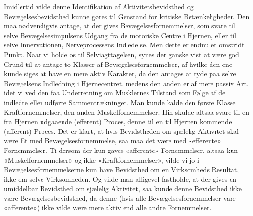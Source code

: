 \documentclass[12pt,a4paper,openany]{book}
\begin{document}
Imidlertid vilde denne Identifikation af Aktivitetsbevidsthed og
Bevægelsesbevidsthed kunne gøres til Genstand for kritiske Betænkeligheder. Den
maa nødvendigvis antage, at der gives Bevægelsesfornemmelser, som svare til
selve Bevægelsesimpulsens Udgang fra de motoriske Centre i Hjernen, eller til
selve Innervationen, Nerveprocessens Indledelse. Men dette er endnu et omstridt
Punkt. Naar vi holde os til Selviagttagelsen, synes der ganske vist at være god
Grund til at antage to Klasser af Bevægelsesfornemmelser, af hvilke den ene
kunde siges at have en mere aktiv Karakter, da den antages at tyde paa selve
Bevægelsens Indledning i Hjernecentret, medens den anden er af mere passiv Art,
idet vi ved den faa Underretning om Musklernes Tilstand som Følge af de
indledte eller udførte Sammentrækninger. Man kunde kalde den første Klasse
Kraftfornemmelser, den anden Muskelfornemmelser. Hin skulde altsaa svare til en
fra Hjernen udgaaende (efferent) Proces, denne til en til Hjernen kommende
(afferent) Proces. Det er klart, at hvis Bevidstheden om sjælelig Aktivitet
skal være Et med Bevægelsesfornemmelse, saa maa det være med «efferente»
Fornemmelser. Ti dersom der kun gaves «afferente» Fornemmelser, altsaa kun
«Muskelfornemmelser» og ikke «Kraftfornemmelser», vilde vi jo i
Bevægelsesfornemmelserne kun have Bevidsthed om en Virksomheds Resultat, ikke
om selve Virksomheden. Og vilde man alligevel fastholde, at der gives en
umiddelbar Bevidsthed om sjælelig Aktivitet, saa kunde denne Bevidsthed ikke
være Bevægelsesbevidsthed, da denne (hvis alle Bevægelsesfornemmelser vare
«afferente») ikke vilde være mere aktiv end alle andre Fornemmelser.
\end{document}
